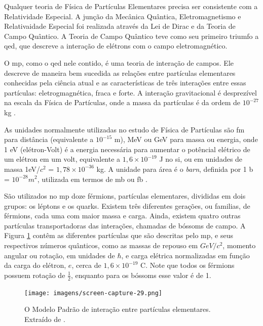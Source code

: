 
Qualquer teoria de Física de Partículas Elementares precisa ser consistente com
a Relatividade Especial. A junção da Mecânica Quântica, Eletromagnetismo e
Relativaidade Especial foi realizada através da Lei de Dirac e da Teoria de
Campo Quântico. A Teoria de Campo Quântico teve como seu primeiro triumfo a
\gls{qed}, que descreve a interação de elétrons com o campo
eletromagnético. 

O \gls{mp}, como o \gls{qed} nele contido, é uma teoria de
interação de campos. Ele descreve de maneira 
bem sucedida as relações entre
partículas elementares conhecidas pela ciência atual 
\cite{Intro_Nuclear} e as características de
três interações entre essas partículas:
eletrogmagnética, fraca e forte. A interação gravitacional é
desprezível na escala da Física de Partículas, onde a massa da partículas é da
ordem de $10^{-27}$ kg \cite{Intro_Standard}.


As unidades normalmente utilizadas no estudo de Física de Partículas são fm para
distância (equivalente a $10^{-15}$ m), MeV ou GeV para massa ou energia, onde 1
eV (elétron-Volt) é a energia necessária para aumentar o potêncial elétrico de
um elétron em um volt, equivalente a $1,6\times10^{-19}$ J no \gls{si}, ou em unidades
de massa 1eV/$c^2$ = $1,78\times10^{-36}$ kg. A unidade para
área é o \emph{barn}, definida por 1 b = $10^{-28} m^2$, utilizada em
termos de mb ou fb \cite{Intro_Nuclear}.

São utilizados no \gls{mp} doze férmions, partículas elementares, divididas em dois grupos: os
léptons e os quarks. Existem três diferentes gerações, ou familias, de férmions, cada uma com maior
massa e carga. Ainda, existem quatro outras partículas transportadoras das
interações, chamadas de bóssoms de campo.
A Figura \ref{fig:modelo_padrao} contêm as diferentes partículas que são
descritas pelo \gls{mp}, e seus respectivos números quânticos, como as massas de repouso em $GeV/c^2$, momento
angular ou rotação, em unidades de $\hbar$, e carga elétrica normalizadas em função da carga
do elétron, $e$, cerca de $1,6\times10^{-19}$ C. Note que todos os férmions
possuem rotação de $\frac{1}{2}$, enquanto para os bóssoms esse valor é de 1.

\begin{figure}[h!t]
\centering
\texttt{[image: imagens/screen-capture-29.png]}
\caption{O Modelo Padrão de interação entre partículas elementares. Extraído de
\cite{tese_torres}.}
\label{fig:modelo_padrao}
\end{figure}

